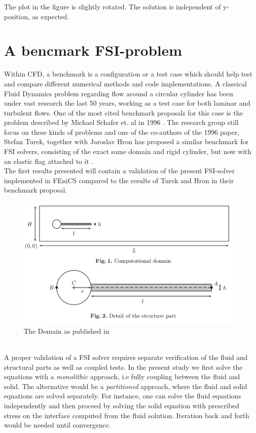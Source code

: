 The plot in the figure is slightly rotated. The solution is independent of y-position, as expected. 


\section{A bencmark FSI-problem}
Within CFD, a benchmark is a configuration or a test case which should help test and compare different numerical methods and code implementations. A classical Fluid Dynamics problem regarding flow around a circular cylinder has been under vast research the last 50 years, working as a test case for both laminar and turbulent flows. One of the most cited benchmark proposals for this case is the problem described by Michael Schafer et. al in 1996 \cite{Scha96}. The research group still focus on these kinds of problems and one of the co-authors of the 1996 paper, Stefan Turek, together with Jaroslav Hron has proposed a similar benchmark for FSI solvers, consisting of the exact same domain and rigid cylinder, but now with an elastic flag attached to it \cite{Ture06}. 
\\ The first results presented will contain a validation of the present FSI-solver implemented in FEniCS compared to the results of Turek and Hron in their benchmark proposal. 
\begin{figure}
\includegraphics[scale=0.3]{figures/Hron_Turek_geometry}
\caption{The Domain as published in \cite{Ture06}}
\label{fig:Geometry}
\end{figure}
\\
A proper validation of a FSI solver requires separate verification of the fluid and structural parts as well as coupled tests. In the present study we first solve the equations with a \textit{monolithic} approach, i.e fully coupling between the fluid and solid. The alternative would be a \textit{partitioned} approach, where the fluid and solid equations are solved separately. For instance, one can solve the fluid equations independently and then proceed by solving the solid equation with prescribed stress on the interface computed from the fluid solution. Iteration back and forth would be needed until convergence. \\
